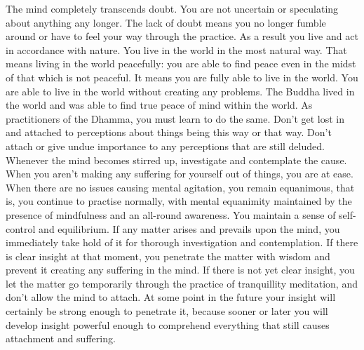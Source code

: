 The mind completely transcends doubt. You are not uncertain or speculating about anything any longer. The lack of doubt means you no longer fumble around or have to feel your way through the practice. As a result you live and act in accordance with nature. You live in the world in the most natural way. That means living in the world peacefully: you are able to find peace even in the midst of that which is not peaceful. It means you are fully able to live in the world. You are able to live in the world without creating any problems. The Buddha lived in the world and was able to find true peace of mind within the world. As practitioners of the Dhamma, you must learn to do the same. Don't get lost in and attached to perceptions about things being this way or that way. Don't attach or give undue importance to any perceptions that are still deluded. Whenever the mind becomes stirred up, investigate and contemplate the cause. When you aren't making any suffering for yourself out of things, you are at ease. When there are no issues causing mental agitation, you remain equanimous, that is, you continue to practise normally, with mental equanimity maintained by the presence of mindfulness and an all-round awareness. You maintain a sense of self-control and equilibrium. If any matter arises and prevails upon the mind, you immediately take hold of it for thorough investigation and contemplation. If there is clear insight at that moment, you penetrate the matter with wisdom and prevent it creating any suffering in the mind. If there is not yet clear insight, you let the matter go temporarily through the practice of tranquillity meditation, and don't allow the mind to attach. At some point in the future your insight will certainly be strong enough to penetrate it, because sooner or later you will develop insight powerful enough to comprehend everything that still causes attachment and suffering.
